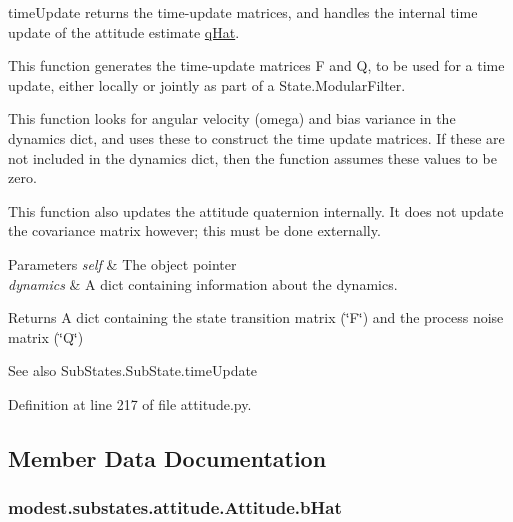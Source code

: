 time\+Update returns the time-\/update matrices, and handles the internal time update of the attitude estimate \hyperlink{classmodest_1_1substates_1_1attitude_1_1Attitude_a22a550534d908153baef2e52f7142c5e}{q\+Hat}. 

This function generates the time-\/update matrices F and Q, to be used for a time update, either locally or jointly as part of a State.\+Modular\+Filter.

This function looks for angular velocity (omega) and bias variance in the dynamics dict, and uses these to construct the time update matrices. If these are not included in the dynamics dict, then the function assumes these values to be zero.

This function also updates the attitude quaternion internally. It does not update the covariance matrix however; this must be done externally.


\begin{DoxyParams}{Parameters}
{\em self} & The object pointer \\
\hline
{\em dynamics} & A dict containing information about the dynamics.\\
\hline
\end{DoxyParams}
\begin{DoxyReturn}{Returns}
A dict containing the state transition matrix (\char`\"{}\+F\char`\"{}) and the process noise matrix (\char`\"{}\+Q\char`\"{})
\end{DoxyReturn}
\begin{DoxySeeAlso}{See also}
Sub\+States.\+Sub\+State.\+time\+Update 
\end{DoxySeeAlso}


Definition at line 217 of file attitude.\+py.



\subsection{Member Data Documentation}
\subsubsection[{\texorpdfstring{b\+Hat}{bHat}}]{\setlength{\rightskip}{0pt plus 5cm}modest.\+substates.\+attitude.\+Attitude.\+b\+Hat}\hypertarget{classmodest_1_1substates_1_1attitude_1_1Attitude_aac0bc92dc53893d2f190c1252690053c}{}\label{classmodest_1_1substates_1_1attitude_1_1Attitude_aac0bc92dc53893d2f190c1252690053c}



